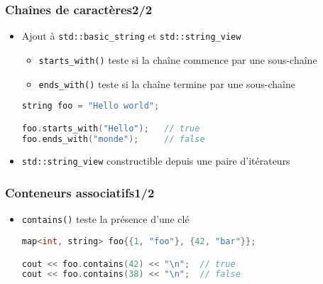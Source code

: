 \documentclass[C++.tex]{subfiles}
\begin{document}
\begin{frame}[fragile]
	\frametitle{Chaînes de caractères\titlehfill{}2/2}
	\begin{itemize}
		\item Ajout à \lstinline|std::basic_string| et \lstinline|std::string_view|
		\begin{itemize}
			\item \lstinline|starts_with()| teste si la chaîne commence par une sous-chaîne
			\item \lstinline|ends_with()| teste si la chaîne termine par une sous-chaîne
		\end{itemize}

	\begin{lstlisting}[language=C++]
string foo = "Hello world";

foo.starts_with("Hello");   // true
foo.ends_with("monde");     // false\end{lstlisting}

		\item \lstinline|std::string_view| constructible depuis une paire d'itérateurs
	\end{itemize}
\end{frame}

\begin{frame}[fragile]
	\frametitle{Conteneurs associatifs\titlehfill{}1/2}
	\begin{itemize}
		\item \lstinline|contains()| teste la présence d'une clé


		\begin{lstlisting}[language=C++]
map<int, string> foo{{1, "foo"}, {42, "bar"}};

cout << foo.contains(42) << "\n";  // true
cout << foo.contains(38) << "\n";  // false\end{lstlisting}
	\end{itemize}
\end{frame}
\end{document}
